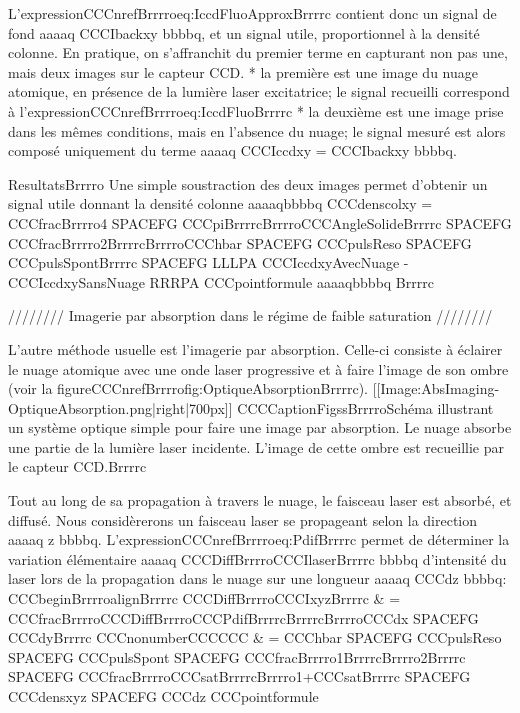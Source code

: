L'expressionCCCnrefBrrrroeq:IccdFluoApproxBrrrrc contient donc un signal de fond aaaaq CCCIbackxy bbbbq, et un signal utile, proportionnel à la densité colonne. En pratique, on s'affranchit du premier terme en capturant non pas une, mais deux images sur le capteur CCD.
	* la première est une image du nuage atomique, en présence de la lumière laser excitatrice; le signal recueilli correspond à l'expressionCCCnrefBrrrroeq:IccdFluoBrrrrc
	* la deuxième est une image prise dans les mêmes conditions, mais en l'absence du nuage; le signal mesuré est alors composé uniquement du terme aaaaq CCCIccdxy = CCCIbackxy bbbbq.





ResultatsBrrrro
Une simple soustraction des deux images permet d'obtenir un signal utile donnant la densité colonne 
aaaaqbbbbq
CCCdenscolxy = CCCfracBrrrro4 SPACEFG CCCpiBrrrrcBrrrroCCCAngleSolideBrrrrc SPACEFG CCCfracBrrrro2BrrrrcBrrrroCCChbar SPACEFG CCCpulsReso SPACEFG CCCpulsSpontBrrrrc SPACEFG 
 LLLPA  
CCCIccdxyAvecNuage - CCCIccdxySansNuage
 RRRPA  
CCCpointformule
aaaaqbbbbq
Brrrrc



//////// Imagerie par absorption dans le régime de faible saturation ////////

L'autre méthode usuelle est l'imagerie par absorption. Celle-ci consiste à éclairer le nuage atomique avec une onde laser progressive et à faire l'image de son ombre (voir la figureCCCnrefBrrrrofig:OptiqueAbsorptionBrrrrc).
[[Image:AbsImaging-OptiqueAbsorption.png|right|700px]]
CCCCaptionFigssBrrrroSchéma illustrant un système optique simple pour faire une image par absorption. Le nuage absorbe une partie de la lumière laser incidente. L'image de cette ombre est recueillie par le capteur CCD.Brrrrc



Tout au long de sa propagation à travers le nuage, le faisceau laser est absorbé, et diffusé. Nous considèrerons un faisceau laser se propageant selon la direction aaaaq z bbbbq. L'expressionCCCnrefBrrrroeq:PdifBrrrrc permet de déterminer la variation élémentaire aaaaq CCCDiffBrrrroCCCIlaserBrrrrc bbbbq d'intensité du laser lors de la propagation dans le nuage sur une longueur aaaaq CCCdz bbbbq:
CCCbeginBrrrroalignBrrrrc
	CCCDiffBrrrroCCCIxyzBrrrrc
	& = CCCfracBrrrroCCCDiffBrrrroCCCPdifBrrrrcBrrrrcBrrrroCCCdx SPACEFG CCCdyBrrrrc 
	CCCnonumberCCCCCC
	& = CCChbar SPACEFG CCCpulsReso SPACEFG  CCCpulsSpont  SPACEFG  CCCfracBrrrro1BrrrrcBrrrro2Brrrrc 
	 SPACEFG  CCCfracBrrrroCCCsatBrrrrcBrrrro1+CCCsatBrrrrc
	 SPACEFG  CCCdensxyz SPACEFG CCCdz 
	CCCpointformule
	
